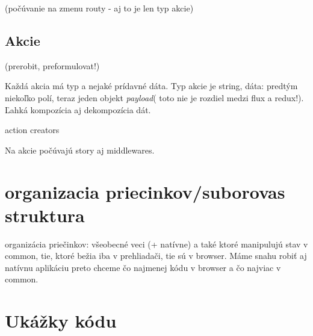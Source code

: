 \TODO{} (počúvanie na zmenu routy - aj to je len typ akcie)

\subsection{Akcie}
\TODO{}(prerobit, preformulovat!)

Každá akcia má typ a nejaké prídavné dáta. %
Typ akcie je string, dáta: predtým niekoľko polí, teraz jeden objekt \emph{payload}(\TODO{} toto nie je rozdiel medzi flux a redux!). Ľahká kompozícia aj dekompozícia dát. %

action creators %

Na akcie počúvajú story aj middlewares.



\section{organizacia priecinkov/suborovas struktura}
\TODO{}

organizácia priečinkov: všeobecné veci (+ natívne) a také ktoré manipulujú stav v common, tie, ktoré bežia iba v prehliadači, tie sú v browser. Máme snahu robiť aj natívnu aplikáciu %
preto chceme čo najmenej kódu v browser a čo najviac v common.

\section{Ukážky kódu}




